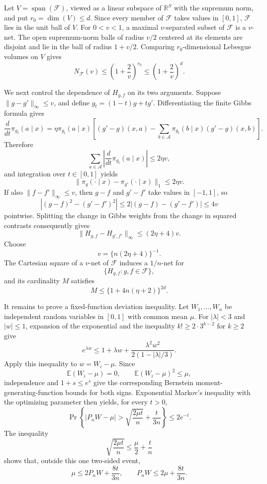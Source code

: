 Let \(V=\operatorname{span}(\mathcal F)\), viewed as a linear subspace of \(\mathbb R^S\) with the supremum norm, and put \(r_0=\dim(V)\le d\). Since every member of \(\mathcal F\) takes values in \([0,1]\), \(\mathcal F\) lies in the unit ball of \(V\). For \(0<v<1\), a maximal \(v\)-separated subset of \(\mathcal F\) is a \(v\)-net. The open supremum-norm balls of radius \(v/2\) centered at its elements are disjoint and lie in the ball of radius \(1+v/2\). Comparing \(r_0\)-dimensional Lebesgue volumes on \(V\) gives
\[
N_{\mathcal F}(v)
\le\left(1+\frac2v\right)^{r_0}
\le\left(1+\frac2v\right)^d.
\]

We next control the dependence of \(H_{g,f}\) on its two arguments. Suppose \(\|g-g'\|_\infty\le v\), and define \(g_t=(1-t)g+tg'\). Differentiating the finite Gibbs formula gives
\[
\frac{d}{dt}\pi_{g_t}(a\mid x)
=\eta\pi_{g_t}(a\mid x)
\left[
(g'-g)(x,a)
-\sum_{b\in\mathcal A}\pi_{g_t}(b\mid x)(g'-g)(x,b)
\right].
\]
Therefore
\[
\sum_{a\in\mathcal A}
\left|\frac{d}{dt}\pi_{g_t}(a\mid x)\right|
\le2\eta v,
\]
and integration over \(t\in[0,1]\) yields
\[
\|\pi_g(\cdot\mid x)-\pi_{g'}(\cdot\mid x)\|_1
\le2\eta v.
\]
If also \(\|f-f'\|_\infty\le v\), then \(g-f\) and \(g'-f'\) take values in \([-1,1]\), so
\[
\left|(g-f)^2-(g'-f')^2\right|
\le2\left|(g-f)-(g'-f')\right|
\le4v
\]
pointwise. Splitting the change in Gibbs weights from the change in squared contrasts consequently gives
\[
\|H_{g,f}-H_{g',f'}\|_\infty
\le(2\eta+4)v.
\]
Choose
\[
v=\{n(2\eta+4)\}^{-1}.
\]
The Cartesian square of a \(v\)-net of \(\mathcal F\) induces a \(1/n\)-net for
\[
\{H_{g,f}:g,f\in\mathcal F\},
\]
and its cardinality \(M\) satisfies
\[
M\le\{1+4n(\eta+2)\}^{2d}.
\]

It remains to prove a fixed-function deviation inequality. Let \(W_1,\ldots,W_n\) be independent random variables in \([0,1]\) with common mean \(\mu\). For \(|\lambda|<3\) and \(|w|\le1\), expansion of the exponential and the inequality \(k!\ge2\cdot3^{k-2}\) for \(k\ge2\) give
\[
e^{\lambda w}
\le1+\lambda w+
\frac{\lambda^2w^2}{2(1-|\lambda|/3)}.
\]
Apply this inequality to \(w=W_i-\mu\). Since
\[
\mathbb E(W_i-\mu)=0,
\qquad
\mathbb E(W_i-\mu)^2\le\mu,
\]
independence and \(1+s\le e^s\) give the corresponding Bernstein moment-generating-function bounds for both signs. Exponential Markov's inequality with the optimizing parameter then yields, for every \(t>0\),
\[
\Pr\left\{
\left|P_nW-\mu\right|
>\sqrt{\frac{2\mu t}{n}}+\frac{t}{3n}
\right\}
\le2e^{-t}.
\]
The inequality
\[
\sqrt{\frac{2\mu t}{n}}
\le\frac{\mu}{2}+\frac tn
\]
shows that, outside this one two-sided event,
\[
\mu\le2P_nW+\frac{8t}{3n},
\qquad
P_nW\le2\mu+\frac{8t}{3n}.
\]

